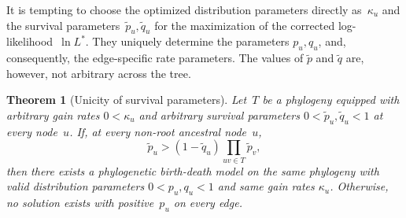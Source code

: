 \documentclass{elsarticle}
\newtheorem{theorem}{Theorem}
\newcommand{\nx}{u}
\newcommand{\ny}{v}
\begin{document}
It is tempting to choose the optimized distribution 
parameters directly as~$\kappa_{\nx}$ and the survival parameters~$\tilde{p}_{\nx}, \tilde{q}_{\nx}$
for the maximization of the corrected log-likelihood~$\ln L^*$. 
They uniquely determine the parameters $p_{\nx}, q_{\nx}$, and, consequently, the edge-specific 
rate parameters.   
The values of $\tilde{p}$ and $\tilde{q}$
are, however, not arbitrary across the tree.  
\begin{theorem}[Unicity of survival parameters]\label{tm:survival.invert}
Let~$T$ be a phylogeny equipped with arbitrary gain rates $0<\kappa_{\nx}$ 
and arbitrary survival parameters $0<\tilde{p}_{\nx}, \tilde{q}_{\nx}<1$
at every node~$\nx$.  
If, at every non-root ancestral node~$\nx$,  
\begin{equation}\tag{*}\label{eq:p.monotone}
\tilde{p}_{\nx}>(1-\tilde{q}_{\nx})\prod_{\nx\ny\in T} \tilde{p}_{\ny},
\end{equation}
then there exists a phylogenetic birth-death model 
on the same phylogeny
with valid distribution parameters $0<p_{\nx}, q_{\nx}<1$ and 
same gain rates $\kappa_{\nx}$. 
Otherwise, no solution exists with positive~$p_{\nx}$ on every edge.   
\end{theorem}
\end{document}

